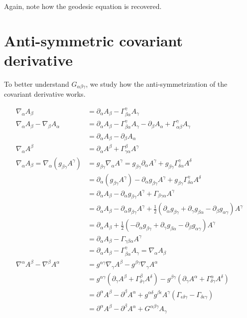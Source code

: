 \documentclass[11pt]{article}
\begin{document}
Again, note how the geodesic equation is recovered.

\section{Anti-symmetric covariant derivative}
To better understand $G_{\alpha\beta\gamma}$, we study how the anti-symmetrization of the covariant derivative works.

\begin{equation}
\begin{aligned}
\nabla_\alpha A_\beta &= \partial_\alpha A_\beta - \Gamma^\gamma_{\beta\alpha} A_\gamma  \\
\nabla_\alpha A_\beta - \nabla_\beta A_\alpha &= \partial_\alpha A_\beta - \Gamma^\gamma_{\beta\alpha} A_\gamma -\partial_\beta A_\alpha + \Gamma^\gamma_{\alpha\beta} A_\gamma  \\
&= \partial_\alpha A_\beta -\partial_\beta A_\alpha  \\
\nabla_\alpha A^\beta &= \partial_\alpha A^\beta + \Gamma^\beta_{\gamma\alpha} A^\gamma  \\
\nabla_\alpha A_\beta = \nabla_\alpha ( g_{\beta\gamma} A^\gamma) &= g_{\beta\gamma} \nabla_\alpha A^\gamma = g_{\beta\gamma} \partial_\alpha A^\gamma + g_{\beta\gamma} \Gamma^\gamma_{\delta\alpha} A^\delta \\
&= \partial_\alpha (g_{\beta\gamma} A^\gamma) - \partial_\alpha g_{\beta\gamma} A^\gamma + g_{\beta\gamma} \Gamma^\gamma_{\delta\alpha} A^\delta \\
&= \partial_\alpha A_\beta - \partial_\alpha g_{\beta\gamma} A^\gamma +  \Gamma_{\beta\gamma\alpha} A^\gamma \\
&= \partial_\alpha A_\beta - \partial_\alpha g_{\beta\gamma} A^\gamma +  \frac{1}{2} (\partial_\alpha g_{\beta\gamma} + \partial_\gamma g_{\beta\alpha} - \partial_\beta g_{\alpha\gamma}) A^\gamma \\
&= \partial_\alpha A_\beta +  \frac{1}{2} ( - \partial_\alpha g_{\beta\gamma} + \partial_\gamma g_{\beta\alpha} - \partial_\beta g_{\alpha\gamma}) A^\gamma \\
&= \partial_\alpha A_\beta - \Gamma_{\gamma\beta\alpha} A^\gamma \\
&= \partial_\alpha A_\beta - \Gamma^\gamma_{\beta\alpha} A_\gamma = \nabla_\alpha A_\beta \\
\nabla^\alpha A^\beta - \nabla^\beta A^\alpha &= g^{\alpha\gamma} \nabla_\gamma A^\beta - g^{\beta\gamma} \nabla_\gamma A^\alpha \\
&= g^{\alpha\gamma} (\partial_\gamma A^\beta + \Gamma^\beta_{\delta\gamma} A^\delta) - g^{\beta\gamma} (\partial_\gamma A^\alpha + \Gamma^\alpha_{\delta\gamma} A^\delta) \\
&= \partial^\alpha A^\beta - \partial^\beta A^\alpha + g^{\alpha\delta} g^{\beta\epsilon} A^\gamma( \Gamma_{\epsilon\delta\gamma} - \Gamma_{\delta\epsilon\gamma}) \\
&= \partial^\alpha A^\beta - \partial^\beta A^\alpha + G^{\alpha\beta\gamma} A_\gamma \\
\end{aligned}
\end{equation}
\end{document}
